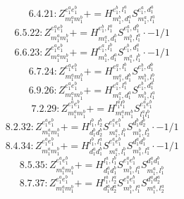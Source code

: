 \documentclass[letterpaper,10pt,fleqn,leqno,onecolumn]{article}
\begin{document}
\begin{equation} \;\;\;\;\;\;  6.4.21: Z^{e_{1}^{a}e_{1}^{b}}_{m_{1}^{a}m_{1}^{b}}+=H^{e_{1}^{b},l_{1}^{a}}_{m_{1}^{b},d_{1}^{a}}S^{e_{1}^{a},d_{1}^{a}}_{m_{1}^{a},l_{1}^{a}} \end{equation}
\begin{equation} \;\;\;\;\;\;  6.5.22: Z^{e_{1}^{a}e_{1}^{b}}_{m_{1}^{a}m_{1}^{b}}+=H^{e_{1}^{b},l_{1}^{a}}_{m_{1}^{a},d_{1}^{b}}S^{e_{1}^{a},d_{1}^{b}}_{m_{1}^{b},l_{1}^{a}}\cdot -1/1 \end{equation}
\begin{equation} \;\;\;\;\;\;  6.6.23: Z^{e_{1}^{a}e_{1}^{b}}_{m_{1}^{a}m_{1}^{b}}+=H^{e_{1}^{a},l_{1}^{b}}_{m_{1}^{b},d_{1}^{a}}S^{e_{1}^{b},d_{1}^{a}}_{m_{1}^{a},l_{1}^{b}}\cdot -1/1 \end{equation}
\begin{equation} \;\;\;\;\;\;  6.7.24: Z^{e_{1}^{a}e_{1}^{b}}_{m_{1}^{a}m_{1}^{b}}+=H^{e_{1}^{a},l_{1}^{b}}_{m_{1}^{a},d_{1}^{b}}S^{e_{1}^{b},d_{1}^{b}}_{m_{1}^{b},l_{1}^{b}} \end{equation}
\begin{equation} \;\;\;\;\;\;  6.9.26: Z^{e_{1}^{a}e_{1}^{b}}_{m_{1}^{a}m_{1}^{b}}+=H^{e_{1}^{a},l_{1}^{a}}_{m_{1}^{a},d_{1}^{a}}S^{e_{1}^{b},d_{1}^{a}}_{m_{1}^{b},l_{1}^{a}} \end{equation}
\begin{equation} \;\;\;\;\;\;  7.2.29: Z^{e_{1}^{a}e_{1}^{b}}_{m_{1}^{a}m_{1}^{b}}+=H^{l_{1}^{a}l_{1}^{b}}_{m_{1}^{a}m_{1}^{b}}S^{e_{1}^{a}e_{1}^{b}}_{l_{1}^{a}l_{1}^{b}} \end{equation}
\begin{equation} \;\;\;\;\;\;  8.2.32: Z^{e_{1}^{a}e_{1}^{b}}_{m_{1}^{a}m_{1}^{b}}+=H^{l_{1}^{b},l_{2}^{b}}_{d_{1}^{b}d_{2}^{b}}S^{e_{1}^{a}e_{1}^{b}}_{m_{1}^{a},l_{1}^{b}}S^{d_{1}^{b}d_{2}^{b}}_{m_{1}^{b},l_{2}^{b}}\cdot -1/1 \end{equation}
\begin{equation} \;\;\;\;\;\;  8.4.34: Z^{e_{1}^{a}e_{1}^{b}}_{m_{1}^{a}m_{1}^{b}}+=H^{l_{1}^{b},l_{1}^{a}}_{d_{1}^{a}d_{1}^{b}}S^{e_{1}^{a}e_{1}^{b}}_{m_{1}^{a},l_{1}^{b}}S^{d_{1}^{a}d_{1}^{b}}_{m_{1}^{b},l_{1}^{a}}\cdot -1/1 \end{equation}
\begin{equation} \;\;\;\;\;\;  8.5.35: Z^{e_{1}^{a}e_{1}^{b}}_{m_{1}^{a}m_{1}^{b}}+=H^{l_{1}^{a},l_{1}^{b}}_{d_{1}^{a}d_{1}^{b}}S^{e_{1}^{a}e_{1}^{b}}_{m_{1}^{b},l_{1}^{a}}S^{d_{1}^{a}d_{1}^{b}}_{m_{1}^{a},l_{1}^{b}} \end{equation}
\begin{equation} \;\;\;\;\;\;  8.7.37: Z^{e_{1}^{a}e_{1}^{b}}_{m_{1}^{a}m_{1}^{b}}+=H^{l_{1}^{a},l_{2}^{a}}_{d_{1}^{a}d_{2}^{a}}S^{e_{1}^{a}e_{1}^{b}}_{m_{1}^{b},l_{1}^{a}}S^{d_{1}^{a}d_{2}^{a}}_{m_{1}^{a},l_{2}^{a}} \end{equation}
\end{document}
